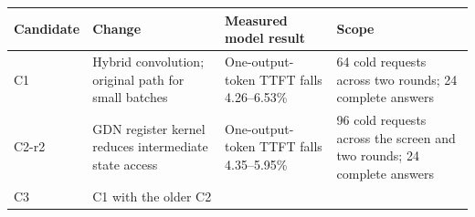\documentclass[10pt,a4paper]{article}
\begin{document}
\begin{longtable}[]{@{}llll@{}}
\toprule
\begin{minipage}[b]{0.22\columnwidth}\raggedright
Candidate\strut
\end{minipage} & \begin{minipage}[b]{0.22\columnwidth}\raggedright
Change\strut
\end{minipage} & \begin{minipage}[b]{0.22\columnwidth}\raggedright
Measured model result\strut
\end{minipage} & \begin{minipage}[b]{0.22\columnwidth}\raggedright
Scope\strut
\end{minipage}\tabularnewline
\midrule
\endhead
\begin{minipage}[t]{0.22\columnwidth}\raggedright
C1\strut
\end{minipage} & \begin{minipage}[t]{0.22\columnwidth}\raggedright
Hybrid convolution; original path for small batches\strut
\end{minipage} & \begin{minipage}[t]{0.22\columnwidth}\raggedright
One-output-token TTFT falls 4.26--6.53\%\strut
\end{minipage} & \begin{minipage}[t]{0.22\columnwidth}\raggedright
64 cold requests across two rounds; 24 complete answers\strut
\end{minipage}\tabularnewline
\begin{minipage}[t]{0.22\columnwidth}\raggedright
C2-r2\strut
\end{minipage} & \begin{minipage}[t]{0.22\columnwidth}\raggedright
GDN register kernel reduces intermediate state access\strut
\end{minipage} & \begin{minipage}[t]{0.22\columnwidth}\raggedright
One-output-token TTFT falls 4.35--5.95\%\strut
\end{minipage} & \begin{minipage}[t]{0.22\columnwidth}\raggedright
96 cold requests across the screen and two rounds; 24 complete
answers\strut
\end{minipage}\tabularnewline
\begin{minipage}[t]{0.22\columnwidth}\raggedright
C3\strut
\end{minipage} & \begin{minipage}[t]{0.22\columnwidth}\raggedright
C1 with the older C2\strut

\end{minipage}
\end{longtable}
\end{document}
